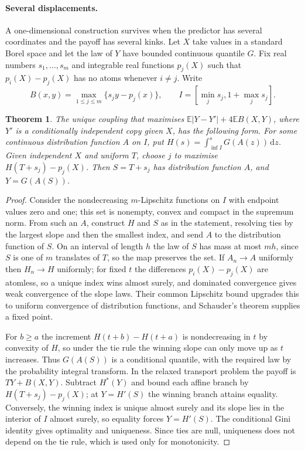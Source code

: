 \documentclass[11pt,a4paper]{article}
\newtheorem{theorem}{Theorem}
\theoremstyle{remark}
\newcommand{\E}{\mathbb E}
\newcommand{\1}{\mathbf 1}
\newcommand{\dd}{\,\mathrm d}
\begin{document}
\paragraph{Several displacements.} A one-dimensional construction survives when the predictor has several coordinates and the payoff has several kinks. Let $X$ take values in a standard Borel space and let the law of $Y$ have bounded continuous quantile $G$. Fix real numbers $s_1,\ldots,s_m$ and integrable real functions $p_j(X)$ such that $p_i(X)-p_j(X)$ has no atoms whenever $i\ne j$. Write
\[
 B(x,y)=\max_{1\le j\le m}\{s_j y-p_j(x)\},\qquad
 I=[\min_j s_j,1+\max_j s_j].
\]
\begin{theorem}\label{multi}
The unique coupling that maximises $\E|Y-Y'|+4\E B(X,Y)$, where $Y'$ is a conditionally independent copy given $X$, has the following form. For some continuous distribution function $A$ on $I$, put $H(s)=\int_{\inf I}^s G(A(z))\dd z$. Given independent $X$ and uniform $T$, choose $j$ to maximise $H(T+s_j)-p_j(X)$. Then $S=T+s_j$ has distribution function $A$, and $Y=G(A(S))$.
\end{theorem}
\begin{proof}
Consider the nondecreasing $m$-Lipschitz functions on $I$ with endpoint values zero and one; this set is nonempty, convex and compact in the supremum norm. From such an $A$, construct $H$ and $S$ as in the statement, resolving ties by the largest slope and then the smallest index, and send $A$ to the distribution function of $S$. On an interval of length $h$ the law of $S$ has mass at most $mh$, since $S$ is one of $m$ translates of $T$, so the map preserves the set. If $A_n\to A$ uniformly then $H_n\to H$ uniformly; for fixed $t$ the differences $p_i(X)-p_j(X)$ are atomless, so a unique index wins almost surely, and dominated convergence gives weak convergence of the slope laws. Their common Lipschitz bound upgrades this to uniform convergence of distribution functions, and Schauder's theorem supplies a fixed point.

For $b\ge a$ the increment $H(t+b)-H(t+a)$ is nondecreasing in $t$ by convexity of $H$, so under the tie rule the winning slope can only move up as $t$ increases. Thus $G(A(S))$ is a conditional quantile, with the required law by the probability integral transform. In the relaxed transport problem the payoff is $TY+B(X,Y)$. Subtract $H^*(Y)$ and bound each affine branch by $H(T+s_j)-p_j(X)$; at $Y=H'(S)$ the winning branch attains equality. Conversely, the winning index is unique almost surely and its slope lies in the interior of $I$ almost surely, so equality forces $Y=H'(S)$. The conditional Gini identity gives optimality and uniqueness. Since ties are null, uniqueness does not depend on the tie rule, which is used only for monotonicity.
\end{proof}
\end{document}
